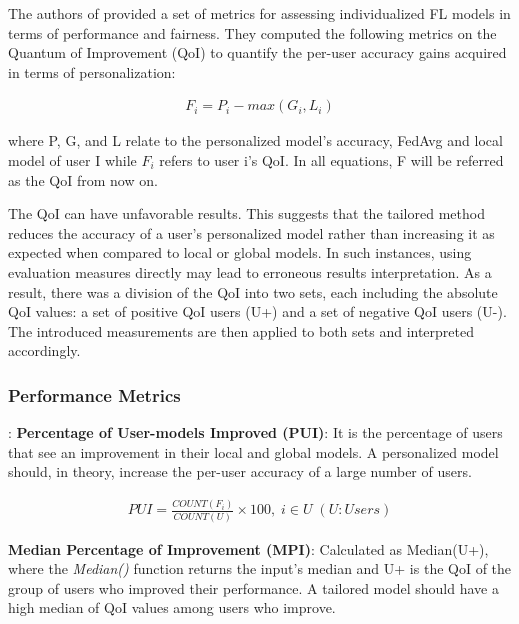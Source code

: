 The authors of \cite{fl23} provided a set of metrics for assessing individualized FL models in terms of performance and fairness. They computed the following metrics on the Quantum of Improvement (QoI) to quantify the per-user accuracy gains acquired in terms of personalization:

\begin{equation} \label{eq1}
\begin{split}
F_i = P_i - max(G_i, L_i)
\end{split}
\end{equation}

where P, G, and L relate to the personalized model's accuracy, FedAvg and local model of user I while $F_i$ refers to user i's QoI. In all equations, F will be referred as the QoI from now on.

The QoI can have unfavorable results. This suggests that the tailored method reduces the accuracy of a user's personalized model rather than increasing it as expected when compared to local or global models. In such instances, using evaluation measures directly may lead to erroneous results interpretation. As a result, there was a division of the QoI into two sets, each including the absolute QoI values: a set of positive QoI users (U+) and a set of negative QoI users (U-). The introduced measurements are then applied to both sets and interpreted accordingly.

\subsubsection{Performance Metrics}:
\textbf{Percentage of User-models Improved (PUI)}: It is the percentage of users that see an improvement in their local and global models. A personalized model should, in theory, increase the per-user accuracy of a large number of users.

\begin{equation} \label{eq2}
\begin{split}
PUI = \frac{COUNT(F_i)}{COUNT(U)} \times 100, \; i \in U \; (U: Users)
\end{split}
\end{equation}

\textbf{Median Percentage of Improvement (MPI)}: Calculated as Median(U+), where the \textit{Median()} function returns the input's median and U+ is the QoI of the group of users who improved their performance. A tailored model should have a high median of QoI values among users who improve.

